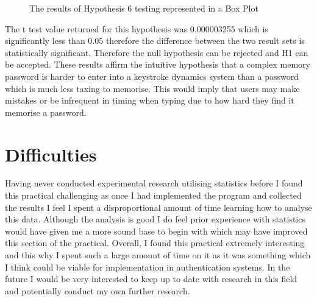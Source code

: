 \documentclass{article}
\begin{document}
\begin{figure} [H]
    \centering
    \caption{The results of Hypothesis 6 testing represented in a Box Plot}
    \label{fig:boxPlotHyp6}
\end{figure}

The t test value returned for this hypothesis was 0.000003255 which is significantly less than 0.05 therefore the difference between the two result sets is statistically significant. Therefore the null hypothesis can be rejected and H1 can be accepted. These results affirm the intuitive hypothesis that a complex memory password is harder to enter into a keystroke dynamics system than a password which is much less taxing to memorise. This would imply that users may make mistakes or be infrequent in timing when typing due to how hard they find it memorise a password.

\section{Difficulties}
Having never conducted experimental research utilising statistics before I found this practical challenging as once I had implemented the program and collected the results I feel I spent a disproportional amount of time learning how to analyse this data. Although the analysis is good I do feel prior experience with statistics would have given me a more sound base to begin with which may have improved this section of the practical. Overall, I found this practical extremely interesting and this why I spent such a large amount of time on it as it was something which I think could be viable for implementation in authentication systems. In the future I would be very interested to keep up to date with research in this field and potentially conduct my own further research. 
\end{document}
